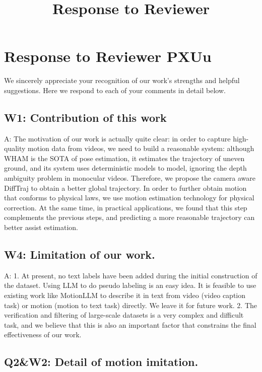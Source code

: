 \documentclass{article}
\title{Response to Reviewer}
\begin{document}
\maketitle

\section{Response to Reviewer PXUu}\label{response-to-reviewer-pxuu}

We sincerely appreciate your recognition of our work's strengths and helpful suggestions. Here we respond to each of your comments in detail below.

\subsection{W1: Contribution of this work}\label{w1-contribution-of-this-work}

A: The motivation of our work is actually quite clear: in order to capture high-quality motion data from videos, we need to build a reasonable system: although WHAM is the SOTA of pose estimation, it estimates the trajectory of uneven ground, and its system uses deterministic models to model, ignoring the depth ambiguity problem in monocular videos. Therefore, we propose the camera aware DiffTraj to obtain a better global trajectory. In order to further obtain motion that conforms to physical laws, we use motion estimation technology for physical correction. At the same time, in practical applications, we found that this step complements the previous steps, and predicting a more reasonable trajectory can better assist estimation.

\subsection{W4: Limitation of our work.}\label{w4-limitation-of-our-work.}

A: 1. At present, no text labels have been added during the initial construction of the dataset. Using LLM to do pseudo labeling is an easy idea. It is feasible to use existing work like MotionLLM to describe it in text from video (video caption task) or motion (motion to text task) directly. We leave it for future work. 2. The verification and filtering of large-scale datasets is a very complex and difficult task, and we believe that this is also an important factor that constrains the final effectiveness of our work.

\subsection{Q2\&W2: Detail of motion imitation.}\label{q2w2-detail-of-motion-imitation.}
\end{document}
